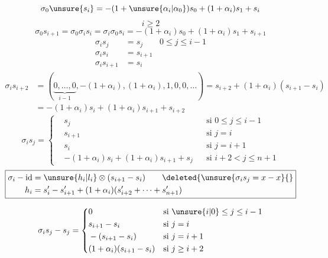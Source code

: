 \[
\sigma_0\unsure{s_i}=-(1+\unsure{\alpha_i|\alpha_0})s_0+(1+\alpha_i)s_1+s_i
\]
\[
i\geq2
\]
\[
\sigma_0s_{i+1}=\sigma_0\sigma_is_i=\sigma_i\sigma_0s_i=-(1+\alpha_i)s_0+(1+\alpha_i)s_1+s_{i+1}
\]
\[
\begin{aligned}
\sigma_is_j&=s_j\qquad 0\leq j\leq i-1\\
\sigma_is_i&=s_{i+1}\\
\sigma_is_{i+1}&=s_i
\end{aligned}
\]
\[
\begin{aligned}
\sigma_is_{i+2}&=(\underbrace{0,\ldots,0}_{i-1},-(1+\alpha_i),(1+\alpha_i),1,0,0,\ldots)=s_{i+2}+(1+\alpha_i)(s_{i+1}-s_i)\\
&=-(1+\alpha_i)s_i+(1+\alpha_i)s_{i+1}+s_{i+2}
\end{aligned}
\]
\[
\boxed{\sigma_is_j=\left\{\begin{aligned}
&s_j&&\text{si }0\leq j\leq i-1\\
&s_{i+1}&&\text{si }j=i\\
&s_i&&\text{si }j=i+1\\
&-(1+\alpha_i)s_i+(1+\alpha_i)s_{i+1}+s_j&&\text{si }i+2<j\leq n+1
\end{aligned}\right.}
\]
\[
\boxed{\begin{aligned}
\sigma_i-\mathrm{id}&=\unsure{h_i|l_i}\otimes(s_{i+1}-s_i)\qquad\deleted{\unsure{\sigma_i s_j=x-x}\{}\\
h_i&=s'_i-s'_{i+1}+(1+\alpha_i)(s'_{i+2}+\cdots+s'_{n+1})
\end{aligned}}
\]

\[
\sigma_is_j-s_j=\left\{\begin{aligned}
&0&&\text{si }\unsure{i|0}\leq j\leq i-1\\
&s_{i+1}-s_i&&\text{si }j=i\\
&-(s_{i+1}-s_i)&&\text{si }j=i+1\\
&(1+\alpha_i)(s_{i+1}-s_i)&&\text{si }j\geq i+2
\end{aligned}\right.
\]
